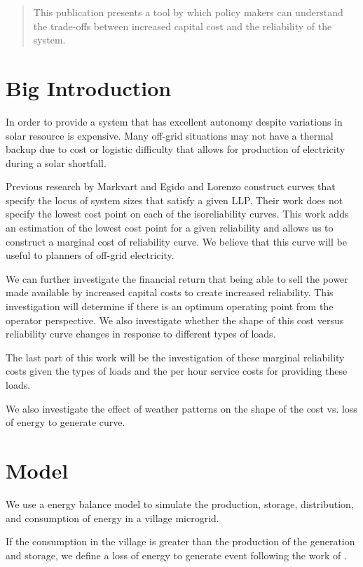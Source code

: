 \documentclass{article}
\begin{document}
\begin{abstract}
This publication presents a tool by which policy makers can
understand the trade-offs between increased capital cost and the
reliability of the system.
\end{abstract}

\section{Big Introduction}
In order to provide a system that has excellent autonomy despite
variations in solar resource is expensive.
Many off-grid situations may not have a thermal backup due to cost or
logistic difficulty that allows for production of electricity during a
solar shortfall.

Previous research by Markvart and Egido and Lorenzo construct curves
that specify the locus of system sizes that satisfy a given LLP.
Their work does not specify the lowest cost point on each of the
isoreliability curves.
This work adds an estimation of the lowest cost point for a given
reliability and allows us to construct a marginal cost of reliability
curve.
We believe that this curve will be useful to planners of off-grid
electricity.

We can further investigate the financial return that being able to sell
the power made available by increased capital costs to create increased
reliability.
This investigation will determine if there is an optimum operating point
from the operator perspective.
We also investigate whether the shape of this cost versus reliability
curve changes in response to different types of loads.

The last part of this work will be the investigation of these marginal
reliability costs given the types of loads and the per hour service
costs for providing these loads.

We also investigate the effect of weather patterns on the shape of the
cost vs. loss of energy to generate curve.


\section{Model}
We use a energy balance model to simulate the production, storage,
distribution, and consumption of energy in a village microgrid.

If the consumption in the village is greater than the production of the
generation and storage, we define a loss of energy to generate event
following the work of \cite{}.
\end{document}
